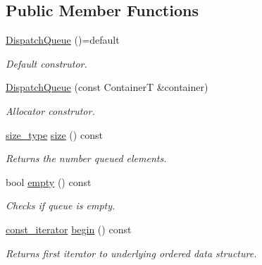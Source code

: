\subsection*{Public Member Functions}
\begin{DoxyCompactItemize}
\item 
\mbox{\label{classflow_1_1_dispatch_queue_aa1002dcf3731bcdc31fe44760f6ba033}} 
\hyperlink{classflow_1_1_dispatch_queue_aa1002dcf3731bcdc31fe44760f6ba033}{Dispatch\+Queue} ()=default
\begin{DoxyCompactList}\small\item\em Default construtor. \end{DoxyCompactList}\item 
\mbox{\label{classflow_1_1_dispatch_queue_a5819de0ca2707479ac8a90234109427c}} 
\hyperlink{classflow_1_1_dispatch_queue_a5819de0ca2707479ac8a90234109427c}{Dispatch\+Queue} (const ContainerT \&container)
\begin{DoxyCompactList}\small\item\em Allocator construtor. \end{DoxyCompactList}\item 
\mbox{\label{classflow_1_1_dispatch_queue_a68f00b308869df4c313ad3ef7676ae44}} 
\hyperlink{classflow_1_1_dispatch_queue_afdc67058e3461410fdd6170046df55bc}{size\+\_\+type} \hyperlink{classflow_1_1_dispatch_queue_a68f00b308869df4c313ad3ef7676ae44}{size} () const
\begin{DoxyCompactList}\small\item\em Returns the number queued elements. \end{DoxyCompactList}\item 
bool \hyperlink{classflow_1_1_dispatch_queue_a447412abd83540a6c595dd7a17116c6c}{empty} () const
\begin{DoxyCompactList}\small\item\em Checks if queue is empty. \end{DoxyCompactList}\item 
\hyperlink{classflow_1_1_dispatch_queue_a307496fdc34a2d59e11114dabf85dc8a}{const\+\_\+iterator} \hyperlink{classflow_1_1_dispatch_queue_a19612c628308b97497ffca62c9b2b420}{begin} () const
\begin{DoxyCompactList}\small\item\em Returns first iterator to underlying ordered data structure. \end{DoxyCompactList}\item 

\end{DoxyCompactItemize}
